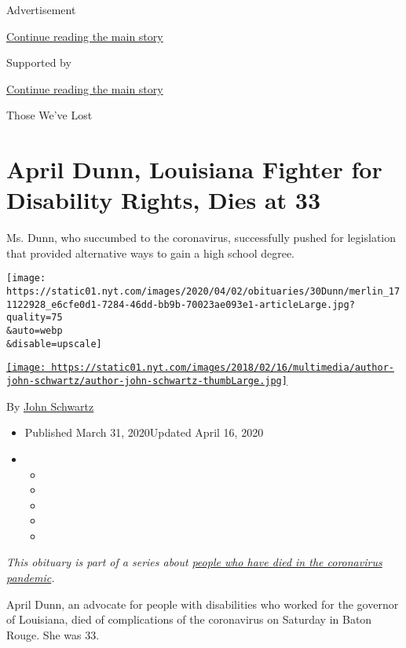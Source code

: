 Advertisement

\protect\hyperlink{after-top}{Continue reading the main story}

Supported by

\protect\hyperlink{after-sponsor}{Continue reading the main story}

Those We've Lost

\hypertarget{april-dunn-louisiana-fighter-for-disability-rights-dies-at-33}{%
\section{April Dunn, Louisiana Fighter for Disability Rights, Dies at
33}\label{april-dunn-louisiana-fighter-for-disability-rights-dies-at-33}}

Ms. Dunn, who succumbed to the coronavirus, successfully pushed for
legislation that provided alternative ways to gain a high school degree.

\texttt{[image: https://static01.nyt.com/images/2020/04/02/obituaries/30Dunn/merlin\_171122928\_e6cfe0d1-7284-46dd-bb9b-70023ae093e1-articleLarge.jpg?quality=75\\\&auto=webp\\\&disable=upscale]}

\href{https://www.nytimes.com/by/john-schwartz}{\texttt{[image: https://static01.nyt.com/images/2018/02/16/multimedia/author-john-schwartz/author-john-schwartz-thumbLarge.jpg]}}

By \href{https://www.nytimes.com/by/john-schwartz}{John Schwartz}

\begin{itemize}
\item
  Published March 31, 2020Updated April 16, 2020
\item
  \begin{itemize}
  \item
  \item
  \item
  \item
  \item
  \end{itemize}
\end{itemize}

\emph{This obituary is part of a series about}
\href{https://www.nytimes.com/series/people-who-have-died-of-the-coronavirus}{\emph{people
who have died in the coronavirus pandemic}}\emph{.}

April Dunn, an advocate for people with disabilities who worked for the
governor of Louisiana, died of complications of the coronavirus on
Saturday in Baton Rouge. She was 33.

